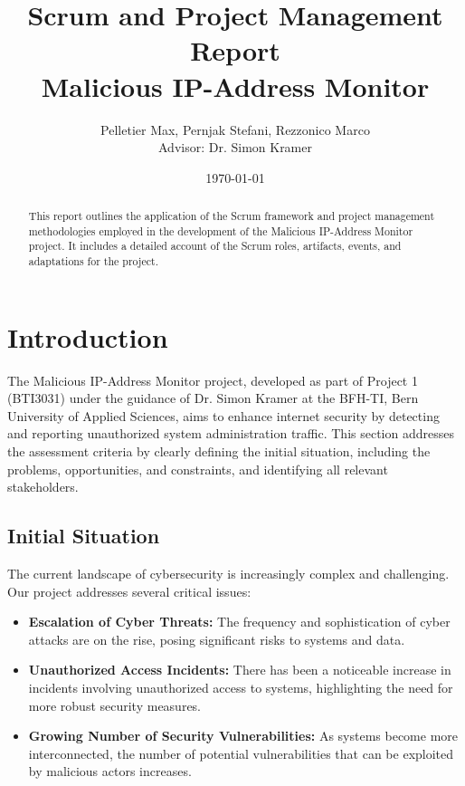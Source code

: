 \documentclass[11pt,a4paper]{article}
\title{Scrum and Project Management Report\\Malicious IP-Address Monitor}
\author{Pelletier Max, Pernjak Stefani, Rezzonico Marco\\Advisor: Dr. Simon Kramer}
\date{\today}
\begin{document}
    \maketitle
    \thispagestyle{empty}

    \newpage
    \begin{abstract}
        This report outlines the application of the Scrum framework and project management methodologies employed in the development of the Malicious IP-Address Monitor project. It includes a detailed account of the Scrum roles, artifacts, events, and adaptations for the project.
    \end{abstract}

    \tableofcontents

    \newpage
    \section{Introduction}\label{sec:introduction}
    The Malicious IP-Address Monitor project, developed as part of Project 1 (BTI3031) under the guidance of Dr. Simon Kramer at the BFH-TI, Bern University of Applied Sciences, aims to enhance internet security by detecting and reporting unauthorized system administration traffic. This section addresses the assessment criteria by clearly defining the initial situation, including the problems, opportunities, and constraints, and identifying all relevant stakeholders.

    \subsection{Initial Situation}\label{subsec:initial-situation}
    The current landscape of cybersecurity is increasingly complex and challenging. Our project addresses several critical issues:
    \begin{itemize}
        \item \textbf{Escalation of Cyber Threats:} The frequency and sophistication of cyber attacks are on the rise, posing significant risks to systems and data.
        \item \textbf{Unauthorized Access Incidents:} There has been a noticeable increase in incidents involving unauthorized access to systems, highlighting the need for more robust security measures.
        \item \textbf{Growing Number of Security Vulnerabilities:} As systems become more interconnected, the number of potential vulnerabilities that can be exploited by malicious actors increases.
    \end{itemize}
\end{document}
